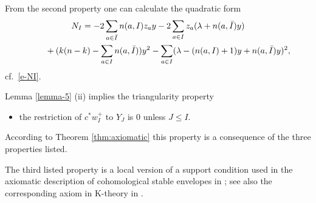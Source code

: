 \documentclass[10pt,a4paper]{amsart}
\numberwithin{equation}{section}
\begin{document}
\begin{Remark} From the second property one can calculate the quadratic form
\begin{gather*} %
 N_I =-2\sum_{a\in\bar I}n(a,I)z_ay-2\sum_{a\in I}z_a(\lambda+n(a,\bar I)y)\\
\hphantom{N_I =}{} +(k(n-k)-\sum_{a\in I}n(a,\bar I))y^2-\sum_{a\in I}(\lambda- (n(a,I)+1)y+n(a,\bar I)y)^2,
\end{gather*}
cf.~\eqref{e-NI}.
\end{Remark}

\begin{Remark}Lemma \ref{lemma-5} (ii) implies the triangularity property
\begin{itemize}\itemsep=0pt
\item the restriction of $c ^*w^+_I$ to $Y_J$ is 0 unless $J\leq I$.
\end{itemize}
According to Theorem \ref{thm:axiomatic} this property is a consequence of the three properties listed.
\end{Remark}

\begin{Remark}The third listed property is a local version of a support condition used in the axiomatic description of cohomological stable envelopes in \cite[Theorem 3.3.4(i)]{MO}; see also the corresponding axiom in K-theory in \cite[Theorem~3.1(I)]{RTV2}.
\end{Remark}
\end{document}
